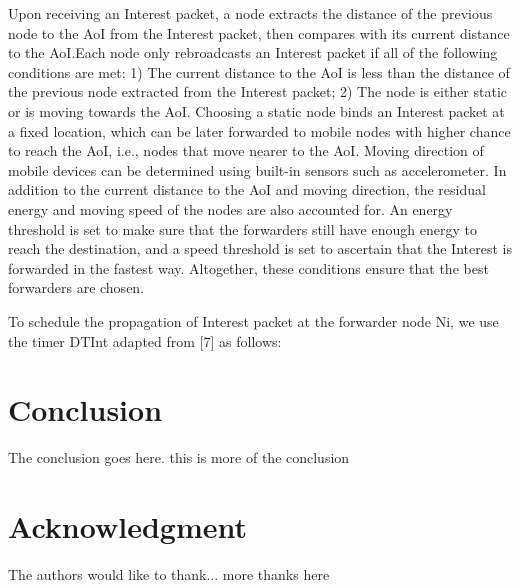 \documentclass[10pt, conference, compsocconf]{IEEEtran}
\begin{document}
Upon receiving an Interest packet, a node extracts the distance of the previous node to the AoI from the Interest packet, then compares with its current distance to the AoI.Each node only rebroadcasts an Interest packet if all of the following conditions are met: 1) The current distance to the AoI is less than the distance of the previous node extracted from the Interest packet; 2) The node is either static or is moving towards the AoI. Choosing a static node binds an Interest packet at a ﬁxed location, which can be later forwarded to mobile nodes with higher chance to reach the AoI, i.e., nodes that move nearer to the AoI. Moving direction of mobile devices can be determined using built-in sensors such as accelerometer. In addition to the current distance to the AoI and moving direction, the residual energy and moving speed of the nodes are also accounted for. An energy threshold is set to make sure that the forwarders still have enough energy to reach the destination, and a speed threshold is set to ascertain that the Interest is forwarded in the fastest way. Altogether, these conditions ensure that the best forwarders are chosen.

To schedule the propagation of Interest packet at the forwarder node Ni, we use the timer DTInt adapted from [7] as follows:

\section{Conclusion} 
The conclusion goes here. this is more of the conclusion

\section*{Acknowledgment}
The authors would like to thank...
more thanks here
\end{document}
